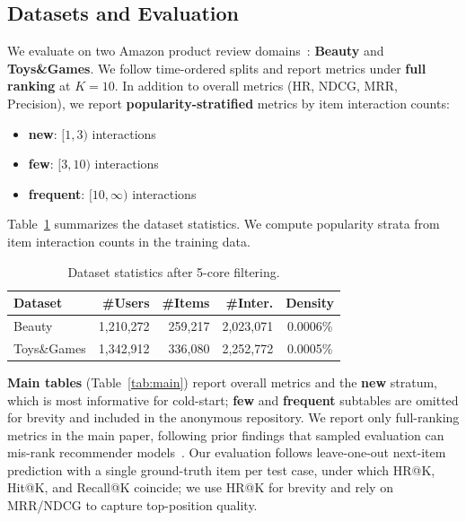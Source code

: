 \documentclass[sigconf,natbib=true,anonymous]{acmart}
\begin{document}
\subsection{Datasets and Evaluation}
We evaluate on two Amazon product review domains~\cite{mcauley2015amazon,ni2019amazon}: \textbf{Beauty} and
\textbf{Toys\&Games}. We follow time-ordered splits and
report metrics under \textbf{full ranking} at $K{=}10$.
In addition to overall metrics (HR, NDCG, MRR, Precision),
we report \textbf{popularity-stratified} metrics by item
interaction counts:
\begin{itemize}[leftmargin=*,itemsep=1pt]
  \item \textbf{new}: $[1,3)$ interactions
  \item \textbf{few}: $[3,10)$ interactions
  \item \textbf{frequent}: $[10,\infty)$ interactions
\end{itemize}
Table~\ref{tab:dataset} summarizes the dataset statistics.
We compute popularity strata from item interaction counts in
the training data.

\begin{table}[h]
\caption{Dataset statistics after 5-core filtering.}
\label{tab:dataset}
\centering
\small
\begin{tabular}{lrrrc}
\toprule
\textbf{Dataset} & \textbf{\#Users} & \textbf{\#Items} & \textbf{\#Inter.} & \textbf{Density} \\
\midrule
Beauty      & 1,210,272 & 259,217 & 2,023,071 & 0.0006\% \\
Toys\&Games & 1,342,912 & 336,080 & 2,252,772 & 0.0005\% \\
\bottomrule
\end{tabular}
\end{table}

\textbf{Main tables} (Table~\ref{tab:main}) report overall metrics and the
\textbf{new} stratum, which is most informative for cold-start;
\textbf{few} and \textbf{frequent} subtables are omitted for brevity
and included in the anonymous repository.
We report only full-ranking metrics in the
main paper, following prior findings that sampled evaluation
can mis-rank recommender models~\cite{krichene2020sampledmetrics}. Our evaluation
follows leave-one-out next-item prediction with a single
ground-truth item per test case, under which HR@K, Hit@K, and
Recall@K coincide; we use HR@K for brevity and rely on
MRR/NDCG to capture top-position quality.
\end{document}

